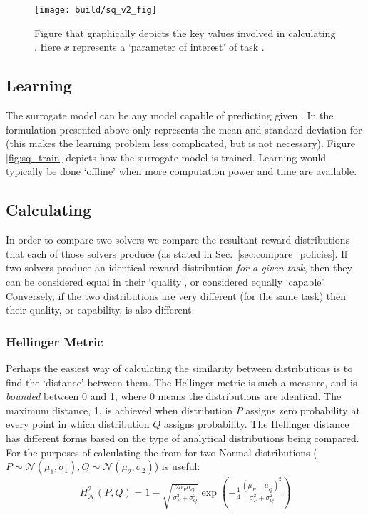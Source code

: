 \begin{figure}[tb]
    \centering
    \texttt{[image: build/sq\_v2\_fig]}
    \caption{Figure that graphically depicts the key values involved in calculating \xQ. Here $x$ represents a `parameter of interest' of task \task.}
    \label{fig:sq_v2}
\end{figure}

\subsection{Learning \surrogate}
The surrogate model \surrogate{} can be any model capable of predicting \rwdstarapprox{} given \task. In the formulation presented above \rwdstariapprox{} only represents the mean and standard deviation for \rwdstari{} (this makes the learning problem less complicated, but is not necessary). Figure \ref{fig:sq_train} depicts how the surrogate model is trained. Learning \surrogate{} would typically be done `offline' when more computation power and time are available.

\subsection{Calculating \xQ}
In order to compare two solvers we compare the resultant reward distributions that each of those solvers produce (as stated in Sec.~\ref{sec:compare_policies}. If two solvers produce an identical reward distribution \emph{for a given task}, then they can be considered equal in their `quality', or considered equally `capable'. Conversely, if the two distributions are very different (for the same task) then their quality, or capability, is also different.

\subsubsection{Hellinger Metric} \label{sec:hellinger}
Perhaps the easiest way of calculating the similarity between distributions is to find the `distance' between them. The Hellinger metric is such a measure, and is \emph{bounded} between 0 and 1, where 0 means the distributions are identical. The maximum distance, 1, is achieved when distribution $P$ assigns zero probability at every point in which distribution $Q$ assigns probability.  The Hellinger distance has different forms based on the type of analytical distributions being compared. For the purposes of calculating \xQ{} the from for two Normal distributions ($P \sim \mathcal{N}(\mu_1,\sigma_1), Q\sim\mathcal{N}(\mu_2,\sigma_2)$) is useful:
\begin{align}
    H_{\mathcal{N}}^{2}(P,Q) = 1-\sqrt{\frac{2\sigma_P\sigma_Q}{\sigma_P^2+\sigma_Q^2}}\exp{\left(-\frac{1}{4}\frac{(\mu_P-\mu_Q)^2}{\sigma_P^2+\sigma_Q^2}\right)}
\end{align}

